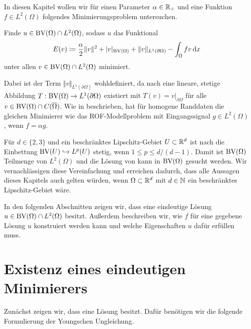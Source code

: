 In diesen Kapitel wollen wir für einen Parameter $\alpha\in\mathbb{R}_+$ und eine
Funktion $f\in L^2(\Omega)$ folgendes Minimierungsproblem untersuchen.

\begin{problem}\label{prob:continuousProblem}
  Finde $u\in \textup{BV}(\Omega)\cap L^2(\Omega)$, sodass
  $u$ das Funktional
  \begin{align}\label{eq:continuousProblem}
    E(v)\coloneqq \frac{\alpha}{2}\Vert v\Vert^2 + |v|_{\textup{BV}(\Omega)}
    +\Vert v\Vert_{L^1(\partial\Omega)}-\int_\Omega fv\,\mathrm{d}x
  \end{align}
  unter allen $v\in\textup{BV}(\Omega)\cap L^2(\Omega)$ minimiert.
\end{problem}
Dabei ist der Term $\Vert v\Vert_{L^1(\partial\Omega)}$ wohldefiniert, da
nach \cite[S. 400, Theorem 10.2.1]{ABM14} eine lineare, stetige Abbildung
$T:\textup{BV}(\Omega)\to L^1(\partial\Omega)$ existiert mit $T(v) =
v|_{\partial\Omega}$ für alle $v\in\textup{BV}(\Omega)\cap C(\overline\Omega)$.
Wie in  beschrieben, hat 
für homogene Randdaten die gleichen Minimierer wie das ROF-Modellproblem mit
Eingangssignal $g\in L^2(\Omega)$, wenn $f=\alpha g$.

\begin{remark}
  Für $d\in\{2,3\}$ und ein beschränktes Lipschitz-Gebiet $U\subset\mathbb{R}^d$ ist
  nach \cite[S. 302, Remark 10.5 (i)]{Bar15} die Einbettung
  $\textup{BV}(U)\hookrightarrow L^p(U)$ stetig, wenn $1\leq p\leq d/(d-1)$. 
  Damit ist $\textup{BV}(\Omega)$ Teilmenge von $L^2(\Omega)$ und die Lösung von
   kann in $\textup{BV}(\Omega)$ gesucht werden. 
  Wir vernachlässigen diese Vereinfachung und erreichen dadurch, dass alle
  Aussagen dieses Kapitels auch gelten würden, wenn
  $\Omega\subset\mathbb{R}^d$ mit $d\in\mathbb{N}$ ein beschränktes Lipschitz-Gebiet wäre.
\end{remark}

In den folgenden Abschnitten zeigen wir, dass
 eine eindeutige Lösung $u\in\textup{BV}(\Omega)\cap
L^2(\Omega)$ besitzt. 
Außerdem beschreiben wir, wie $f$ für eine gegebene Lösung $u$ konstruiert
werden kann und welche Eigenschaften $u$ dafür erfüllen muss.


\section{Existenz eines eindeutigen Minimierers}
Zunächst zeigen wir, dass  eine Lösung besitzt.
Dafür benötigen wir die folgende Formulierung der Youngschen Ungleichung.


